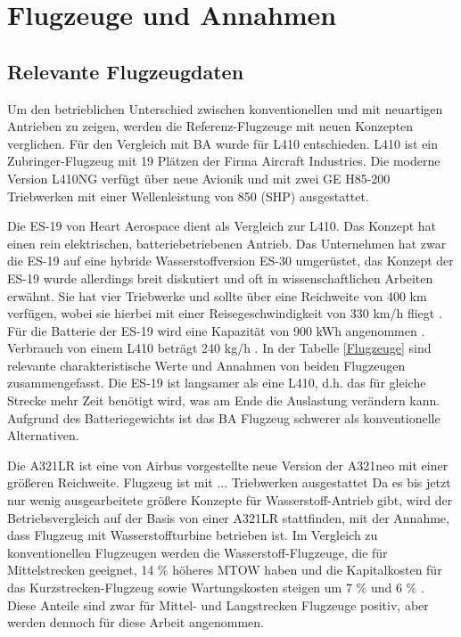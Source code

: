 \section{Flugzeuge und Annahmen}
\subsection{Relevante Flugzeugdaten}
Um den betrieblichen Unterschied zwischen konventionellen und mit neuartigen Antrieben zu zeigen, werden die Referenz-Flugzeuge mit neuen 
Konzepten verglichen.
Für den Vergleich mit BA wurde für L410 entschieden. L410 ist ein Zubringer-Flugzeug mit 19 Plätzen der Firma Aircraft Industries. 
Die moderne Version L410NG verfügt über neue Avionik und mit zwei GE H85-200 Triebwerken mit einer Wellenleistung von 850 (SHP) ausgestattet.

Die ES-19 von Heart Aerospace dient als Vergleich zur L410. Das Konzept hat einen rein elektrischen, batteriebetriebenen Antrieb.
Das Unternehmen hat zwar die ES-19 auf eine hybride Wasserstoffversion ES-30 umgerüstet, das Konzept der ES-19 wurde allerdings breit diskutiert 
und oft in wissenschaftlichen Arbeiten erwähnt. Sie hat vier Triebwerke und sollte über eine Reichweite von 400 km verfügen, 
wobei sie hierbei mit einer Reisegeschwindigkeit von 330 km/h fliegt \cite{anker2023feasibility} \cite{heart_aerospace_es19}.
Für die Batterie der ES-19 wird eine Kapazität von 900 kWh angenommen \cite{donckers2024electric}. \\
Verbrauch von einem L410 beträgt 240 kg/h \cite{let2016l410}.
In der Tabelle \ref{Flugzeuge} sind relevante charakteristische Werte und Annahmen von beiden Flugzeugen zusammengefasst.
Die ES-19 ist langsamer als eine L410, d.h. das für gleiche Strecke mehr Zeit benötigt wird, was am Ende die Auslastung verändern kann.
Aufgrund des Batteriegewichts ist das BA Flugzeug schwerer als konventionelle Alternativen.

Die A321LR ist eine von Airbus vorgestellte neue Version der A321neo mit einer größeren Reichweite.
Flugzeug ist mit ... Triebwerken ausgestattet 
Da es bis jetzt nur wenig ausgearbeitete größere Konzepte für Wasserstoff-Antrieb gibt, wird der Betriebsvergleich
auf der Basis von einer A321LR stattfinden, mit der Annahme, dass Flugzeug mit Wasserstoffturbine betrieben ist.
Im Vergleich zu konventionellen Flugzeugen werden die Wasserstoff-Flugzeuge, die für Mittelstrecken geeignet, 14 \% höheres MTOW haben 
und die Kapitalkosten für das Kurzstrecken-Flugzeug sowie Wartungskosten steigen um 7 \% und 6 \% \cite{sky2020hydrogen}. 
Diese Anteile sind zwar für Mittel- und Langstrecken Flugzeuge positiv, aber werden dennoch für diese Arbeit angenommen.

